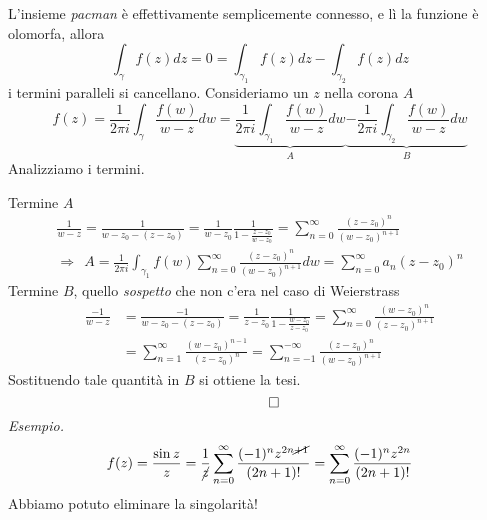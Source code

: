 \documentclass[10pt,a4paper,twoside]{book}
\begin{document}
\begin{figure}[htpb]
	
\end{figure}
\FloatBarrier



L'insieme \textit{pacman} è effettivamente semplicemente connesso, e lì la funzione è olomorfa, allora
\begin{equation*}
\int _{\gamma } f( z) dz=0=\int _{\gamma _{1}} f( z) dz-\int _{\gamma _{2}} f( z) dz
\end{equation*}
i termini paralleli si cancellano. Consideriamo un $z$ nella corona $A$
\begin{equation*}
f( z) =\frac{1}{2\pi i}\int _{\gamma }\frac{f( w)}{w-z} dw=\underbrace{\frac{1}{2\pi i}\int _{\gamma _{1}}\frac{f( w)}{w-z} dw}_{A}\underbrace{-\frac{1}{2\pi i}\int _{\gamma _{2}}\frac{f( w)}{w-z} dw}_{B}
\end{equation*}
Analizziamo i termini.

Termine $A$
\begin{gather*}
\frac{1}{w-z} =\frac{1}{w-z_{0} -( z-z_{0})} =\frac{1}{w-z_{0}}\frac{1}{1-\frac{z-z_{0}}{w-z_{0}}} =\sum\limits ^{\infty }_{n=0}\frac{( z-z_{0})^{n}}{( w-z_{0})^{n+1}}\\
\Rightarrow \ \ A=\frac{1}{2\pi i}\int _{\gamma _{1}} f( w)\sum\limits ^{\infty }_{n=0}\frac{( z-z_{0})^{n}}{( w-z_{0})^{n+1}} dw=\sum\limits ^{\infty }_{n=0} a_{n}( z-z_{0})^{n}
\end{gather*}
Termine $B$, quello \textit{sospetto} che non c'era nel caso di Weierstrass
\begin{align*}
\frac{-1}{w-z} & =\frac{-1}{w-z_{0} -( z-z_{0})} =\frac{1}{z-z_{0}}\frac{1}{1-\frac{w-z_{0}}{z-z_{0}}} =\sum\limits ^{\infty }_{n=0}\frac{( w-z_{0})^{n}}{( z-z_{0})^{n+1}}\\
 & =\sum\limits ^{\infty }_{n=1}\frac{( w-z_{0})^{n-1}}{( z-z_{0})^{n}} =\sum\limits ^{-\infty }_{n=-1}\frac{( z-z_{0})^{n}}{( w-z_{0})^{n+1}}
\end{align*}
Sostituendo tale quantità in $B$ si ottiene la tesi.
\begin{equation*}
\qed 
\end{equation*}
\textit{Esempio.}
\begin{equation*}
f( z) =\frac{\sin z}{z} =\frac{1}{\cancel{z}}\sum\limits ^{\infty }_{n=0}\frac{( -1)^{n} z^{2n\cancel{+1}}}{( 2n+1) !} =\sum\limits ^{\infty }_{n=0}\frac{( -1)^{n} z^{2n}}{( 2n+1) !}
\end{equation*}
Abbiamo potuto eliminare la singolarità!
\end{document}
